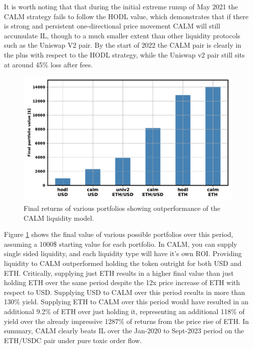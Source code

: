 \documentclass [10pt, twoside] {article}
\begin{document}
It is worth noting that that during the initial extreme runup of May 2021 the CALM strategy fails to follow the HODL value, which demonstrates that if there is strong and persistent one-directional price movement CALM will still accumulate IL, though to a much smaller extent than other liquidity protocols such as the Uniswap V2 pair. By the start of 2022 the CALM pair is clearly in the plus with respect to the HODL strategy, while the Uniswap v2 pair still sits at around 45\% loss after fees.

\begin{figure}[!htbp]
\centering
\includegraphics[width=\textwidth,keepaspectratio]{figures/returns.pdf}
\caption{Final returns of various portfolios showing outperformance of the CALM liquidity model.}
\label{fig:returns}
\end{figure}

Figure \ref{fig:returns} shows the final value of various possible portfolios over this period, assuming a 1000\$ starting value for each portfolio. In CALM, you can supply single sided liquidity, and each liquidity type will have it's own ROI. Providing liquidity to CALM outperformed holding the token outright for both USD and ETH. Critically, supplying just ETH results in a higher final value than just holding ETH over the same period despite the 12x price increase of ETH with respect to USD. Supplying USD to CALM over this period results in more than 130\% yield. Supplying ETH to CALM over this period would have resulted in an additional 9.2\% of ETH over just holding it, representing an additional 118\% of yield over the already impressive 1287\% of returns from the price rise of ETH. In summary, CALM clearly beats IL over the Jan-2020 to Sept-2023 period on the ETH/USDC pair under pure toxic order flow.
\end{document}
